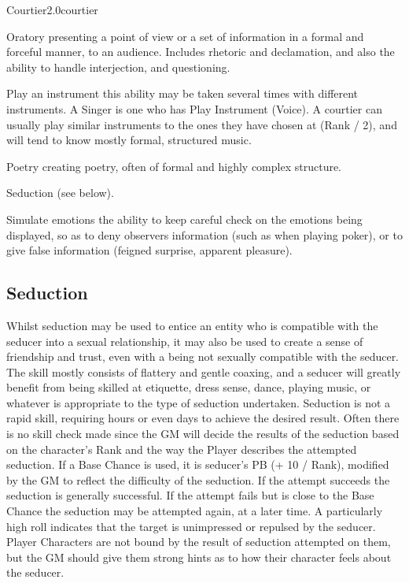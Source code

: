 \begin{skill}{Courtier}{2.0}{courtier}
\begin{Description}
\item[Oratory] presenting a point of view or a set of information in a
formal and forceful manner, to an audience. Includes rhetoric and
declamation, and also the ability to handle interjection, and
questioning.

\item[Play an instrument] this ability may be taken several times with
different instruments. A Singer is one who has Play Instrument
(Voice). A courtier can usually play similar instruments to the ones
they have chosen at (Rank / 2), and will tend to know mostly formal,
structured music.

\item[Poetry] creating poetry, often of formal and highly complex
structure.

\item[Seduction] (see below).

\item[Simulate emotions] the ability to keep careful check on the
emotions being displayed, so as to deny observers information (such as
when playing poker), or to give false information (feigned surprise,
apparent pleasure).

\end{Description}

\subsection{Seduction}

Whilst seduction may be used to entice an entity who is compatible
with the seducer into a sexual relationship, it may also be used to
create a sense of friendship and trust, even with a being not sexually
compatible with the seducer.  The skill mostly consists of flattery
and gentle coaxing, and a seducer will greatly benefit from being
skilled at etiquette, dress sense, dance, playing music, or whatever
is appropriate to the type of seduction undertaken.  Seduction is not
a rapid skill, requiring hours or even days to achieve the desired
result. Often there is no skill check made since the GM will decide
the results of the seduction based on the character's Rank and the way
the Player describes the attempted seduction.  If a Base Chance is
used, it is seducer's PB (+ 10 / Rank), modified by the GM to reflect
the difficulty of the seduction. If the attempt succeeds the seduction
is generally successful. If the attempt fails but is close to the Base
Chance the seduction may be attempted again, at a later time. A
particularly high roll indicates that the target is unimpressed or
repulsed by the seducer. Player Characters are not bound by the result
of seduction attempted on them, but the GM should give them strong
hints as to how their character feels about the seducer.

\end{skill}
